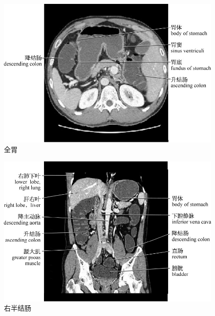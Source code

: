 \begin{figure}[!htbp]
 \centering
 \includegraphics{./images/Image00179.jpg}
 \captionsetup{justification=centering}
 \caption{全胃}
  \end{figure} 
 \FloatBarrier

\begin{figure}[!htbp]
 \centering
 \includegraphics{./images/Image00180.jpg}
 \captionsetup{justification=centering}
 \caption{右半结肠}
  \end{figure} 
 \FloatBarrier

